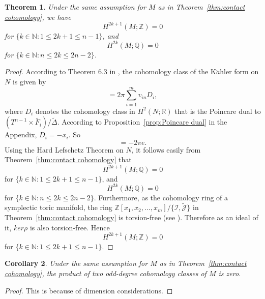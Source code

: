 \documentclass[12pt]{amsart}
\def\N {{\mathbb{N}}}
\def\Q {{\mathbb{Q}}}
\def\Z {{\mathbb{Z}}}
\def\R {{\mathbb{R}}}
\def\I {{\mathcal{I}}}
\def\J {{\mathcal{J}}}
\newtheorem{theorem}{Theorem}[section]
\newtheorem{corollary}[theorem]{Corollary}
\theoremstyle{definition}
\numberwithin{equation}{section}
\begin{document}
\begin{theorem}\label{thm:vanishing odd}Under the same assumption
for  $M$ as in Theorem~\ref{thm:contact cohomology}, we have
\begin{equation}H^{2k+1}(M;\Z)=0
\end{equation}
for $\{k\in \N: 1\leq 2k+1\leq n-1\}$, and
\begin{equation}
H^{2k}(M;\Q)=0
\end{equation}
for $\{k\in \N:n\leq 2k\leq 2n-2\}$.
\end{theorem}
\begin{proof}
According to Theorem 6.3 in \cite{Guillemin:Kaehler form}, the
cohomology class of the K$\ddot{a}$hler form on $N$ is given by
\begin{equation}
[\omega]=2\pi\sum_{i=1}^{m}v_{in}D_{i},
\end{equation}
where $D_{i}$ denotes the cohomology class in $H^{2}(N;\R)$ that is
the Poincare dual to $(T^{n-1}\times \tilde{F_{i}})/\tilde{\Delta}$.
According to Proposition~\ref{prop:Poincare dual} in the Appendix,
$D_{i}=-x_{i}$. So
\begin{equation}
[\omega]=-2\pi e.
\end{equation}
Using the Hard Lefschetz Theorem on $N$, it follows easily from
Theorem~\ref{thm:contact cohomology} that
\begin{equation}H^{2k+1}(M;\Q)=0
\end{equation}
for $\{k\in \N: 1\leq 2k+1\leq n-1\}$, and
\begin{equation}
H^{2k}(M;\Q)=0
\end{equation}
for $\{k\in \N:n\leq 2k\leq 2n-2\}$. Furthermore, as the cohomology
ring of a symplectic toric manifold, the ring
$\Z[x_{1},x_{2},...,x_{m}]/\{\I,\tilde{\J}\}$ in
Theorem~\ref{thm:contact cohomology} is torsion-free (see
\cite{toric variety}). Therefore as an ideal of it, $ker\rho$ is
also torsion-free. Hence
\begin{equation}H^{2k+1}(M;\Z)=0
\end{equation}
for $\{k\in \N: 1\leq 2k+1\leq n-1\}$.
\end{proof}

\begin{corollary}\label{cor:trivial between odd}
Under the same assumption for $M$ as in Theorem~\ref{thm:contact
cohomology}, the product of two odd-degree cohomology classes of $M$
is zero.
\end{corollary}
\begin{proof}
This is because of dimension considerations.
\end{proof}
\end{document}

